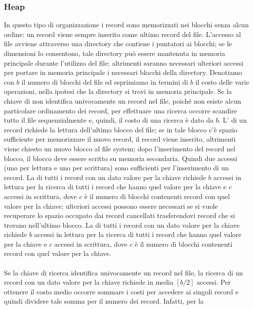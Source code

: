 \subsubsection{Heap}
In questo tipo di organizzazione i record sono memorizzati nei blocchi senza alcun ordine: un
record viene sempre inserito come ultimo record del file. L'accesso al file avviene attraverso una
directory che contiene i puntatori ai blocchi; se le dimensioni lo consentono, tale directory può
essere mantenuta in memoria principale durante l'utilizzo del file; altrimenti saranno necessari
ulteriori accessi per portare in memoria principale i necessari blocchi della directory.
Denotiamo con $b$ il numero di blocchi del file ed esprimiamo in termini di $b$ il costo delle varie
operazioni, nella ipotesi che la directory si trovi in memoria principale.
Se la chiave di  non identifica univocamente un record nel file, poiché non esiste alcun
particolare ordinamento dei record, per effettuare una ricerca occorre scandire tutto il file
sequenzialmente e, quindi, il costo di una ricerca è dato da $b$. L' di un record richiede la
lettura dell'ultimo blocco del file; se in tale blocco c'è spazio sufficiente per memorizzare il nuovo
record, il record viene inserito, altrimenti viene chiesto un nuovo blocco al file system; dopo
l'inserimento del record nel blocco, il blocco deve essere scritto su memoria secondaria. Quindi due
accessi (uno per lettura e uno per scrittura) sono sufficienti per l'inserimento di un record. La
 di tutti i record con un dato valore per la chiave richiede $b$ accessi in lettura 
per la ricerca di tutti i record che hanno quel valore per la chiave e $c$ accessi in scrittura, dove $c$ è il
numero di blocchi contenenti record con quel valore per la chiave; ulteriori accessi possono essere
necessari se si vuole recuperare lo spazio occupato dai record cancellati trasferendovi record che si
trovano nell'ultimo blocco. La  di tutti i record con un dato valore per la chiave richiede $b$
accessi in lettura per la ricerca di tutti i record che hanno quel valore per la chiave e $c$ accessi in
scrittura, dove $c$ è il numero di blocchi contenenti record con quel valore per la chiave.\\\\
Se la chiave di ricerca identifica univocamente un record nel file, la ricerca di un record con un dato
valore per la chiave richiede in media $[b/2]$ accessi. Per ottenere il costo medio occorre sommare i costi 
per accedere ai singoli record e quindi dividere tale somma per il numero dei record. Infatti, per la 
